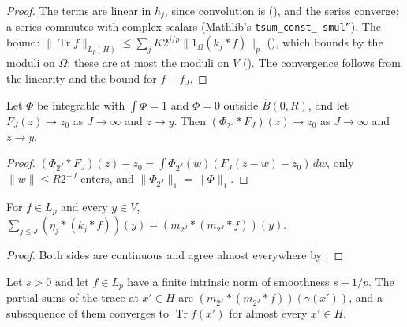 \begin{proof}
\leanok
The terms are linear in $h_j$, since convolution is (), and the series converge;
a series commutes with complex scalars (Mathlib's \texttt{tsum\_\allowbreak const\_\allowbreak
smul''}). The bound:
$\|\operatorname{Tr} f\|_{L_p(H)} \leq \sum_j K 2^{j/p} \|1_\Omega (k_j * f)\|_p$
(), which  bounds by the moduli on $\Omega$;
these are at most the moduli on $V$ (). The convergence follows from the
linearity and the bound for $f - f_J$.
\end{proof}

\begin{lemma}
\label{lem:approx-identity-points}
\leanok
{}
Let $\Phi$ be integrable with $\int \Phi = 1$ and $\Phi = 0$ outside $\overline{B}(0, R)$, and let
$F_J(z) \to z_0$ as $J \to \infty$ and $z \to y$. Then $(\Phi_{2^J} * F_J)(z) \to z_0$ as
$J \to \infty$ and $z \to y$.
\end{lemma}

\begin{proof}
\leanok
$(\Phi_{2^J} * F_J)(z) - z_0 = \int \Phi_{2^J}(w) (F_J(z - w) - z_0) \, dw$, only
$\|w\| \leq R 2^{-J}$ enters, and $\|\Phi_{2^J}\|_1 = \|\Phi\|_1$.
\end{proof}

\begin{lemma}
\label{lem:reproducing-pointwise}
\leanok
{}
For $f \in L_p$ and every $y \in V$,
$\sum_{j \leq J} (\eta_j * (k_j * f))(y) = (m_{2^J} * (m_{2^J} * f))(y)$.
\end{lemma}

\begin{proof}
\leanok
Both sides are continuous and agree almost everywhere by .
\end{proof}

\begin{lemma}
\label{lem:trace-mollified}
\leanok
{}
Let $s > 0$ and let $f \in L_p$ have a finite intrinsic norm of smoothness $s + 1/p$. The partial
sums of the trace at $x' \in H$ are $(m_{2^J} * (m_{2^J} * f))(\gamma(x'))$, and a subsequence of
them converges to $\operatorname{Tr} f(x')$ for almost every $x' \in H$.
\end{lemma}


